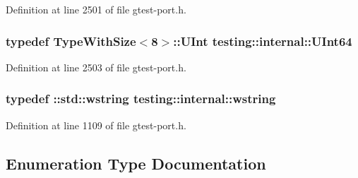Definition at line 2501 of file gtest-\/port.\+h.

\subsubsection[{\texorpdfstring{U\+Int64}{UInt64}}]{\setlength{\rightskip}{0pt plus 5cm}typedef {\bf Type\+With\+Size}$<$8$>$\+::U\+Int {\bf testing\+::internal\+::\+U\+Int64}}\hypertarget{namespacetesting_1_1internal_aa6a1ac454e6d7e550fa4925c62c35caa}{}\label{namespacetesting_1_1internal_aa6a1ac454e6d7e550fa4925c62c35caa}


Definition at line 2503 of file gtest-\/port.\+h.

\subsubsection[{\texorpdfstring{wstring}{wstring}}]{\setlength{\rightskip}{0pt plus 5cm}typedef \+::std\+::wstring {\bf testing\+::internal\+::wstring}}\hypertarget{namespacetesting_1_1internal_a3f543179329c353aee1d7b54a9a8e335}{}\label{namespacetesting_1_1internal_a3f543179329c353aee1d7b54a9a8e335}


Definition at line 1109 of file gtest-\/port.\+h.



\subsection{Enumeration Type Documentation}
